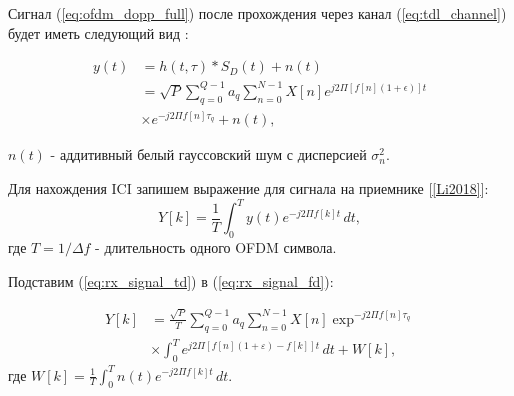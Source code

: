 Сигнал (\ref{eq:ofdm_dopp_full}) после прохождения через канал (\ref{eq:tdl_channel})
будет иметь следующий вид :

\begin{equation}
    \label{eq:rx_signal_td}
    \begin{split}
    y(t) &= h(t, \tau) * S_D(t) + n(t) \\
         &= \sqrt{P} \sum_{q = 0}^{Q - 1} a_q \sum_{n = 0}^{N - 1} X[n] e^{j2 \Pi [f[n](1 + \epsilon)] t} \\
         &\times e^{-j2 \Pi f[n]\tau_q} + n(t),
    \end{split}
\end{equation}

\noindent $n(t)$ - аддитивный белый гауссовский шум с дисперсией $\sigma_n^2$.

\noindent Для нахождения ICI запишем выражение для сигнала на приемнике [\ref{Li2018}]:
\begin{equation}
    Y[k] = \frac{1}{T} \int_{0}^{T} y(t) e^{-j 2 \Pi f[k] t} \,dt,
    \label{eq:rx_signal_fd}
\end{equation}
\noindent где $T = 1/\Delta f$ - длительность одного OFDM символа.


\noindent Подставим (\ref{eq:rx_signal_td}) в (\ref{eq:rx_signal_fd}):

\begin{equation}
    \label{eq:rx_signal_complete_fd}
    \begin{split}
    Y[k] &= \frac{\sqrt{P}}{T} \sum_{q = 0}^{Q - 1} a_q \sum_{n = 0}^{N-1} X[n] \exp^{-j2 \Pi f[n]\tau_q} \\
         &\times \int_{0}^{T}  e^{j 2 \Pi [f[n] (1 + \varepsilon ) - f[k]] t} \,dt + W[k],
    \end{split}
\end{equation}
где $W[k] = \frac{1}{T} \int_{0}^{T} n(t) e^{-j 2 \Pi f[k] t} \,dt$.

